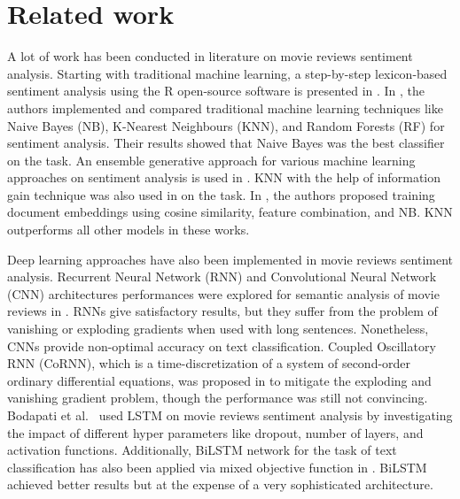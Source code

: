 \section{Related work}
\label{RelatedWork}
A lot of work has been conducted in literature on movie reviews sentiment analysis. Starting with traditional machine learning, a step-by-step lexicon-based sentiment analysis using the R open-source software is presented in \cite{anandarajan2019sentiment}. In \cite{baid2017sentiment}, the authors implemented and compared traditional machine learning techniques like Naive Bayes (NB), K-Nearest Neighbours (KNN), and  Random Forests (RF) for sentiment analysis. Their results showed that Naive Bayes was the best classifier on the task. An ensemble generative approach for various machine learning approaches on sentiment analysis is used in \cite{mesnil2014ensemble}. KNN with the help of information gain technique was also used in \cite{daeli2020sentiment} on the task. In \cite{thongtan2019sentiment}, the authors proposed training document embeddings using cosine similarity, feature combination, and NB. KNN outperforms all other models in these works.

Deep learning approaches have also been implemented in movie reviews sentiment analysis. Recurrent Neural Network (RNN) and Convolutional Neural Network (CNN) architectures performances were explored for semantic analysis of movie reviews in \cite{shirani2014applications}. RNNs give satisfactory results, but they suffer from the problem of vanishing or exploding gradients when used with long sentences. Nonetheless, CNNs provide non-optimal accuracy on text classification. Coupled Oscillatory RNN (CoRNN), which is a time-discretization of a system of second-order ordinary differential equations, was proposed in \cite{rusch2020coupled} to mitigate the exploding and vanishing gradient problem, though the performance was still not convincing.  Bodapati et al.~\cite{bodapati2019sentiment} used LSTM on movie reviews sentiment analysis by investigating the impact of different hyper parameters like dropout, number of layers, and activation functions. Additionally, BiLSTM network for the task of text classification has also been applied via mixed objective function in \cite{singh2020revisiting}. BiLSTM achieved better results but at the expense of a very sophisticated architecture.  %

